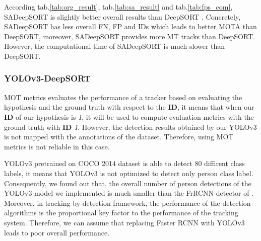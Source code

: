 According tab.\ref{tab:org_result}, tab.\ref{tab:sa_result} and tab.\ref{tab:fps_com}, SADeepSORT is slightly better overall results than DeepSORT\cite{Wojke2017simple}
. Concretely, SADeepSORT has less overall FN, FP and IDs which leads to better MOTA than DeepSORT\cite{Wojke2017simple}, moreover, 
SADeepSORT provides more MT tracks than DeepSORT\cite{Wojke2017simple}. However, the computational time of SADeepSORT is much slower than DeepSORT\cite{Wojke2017simple}.



\subsubsection{YOLOv3-DeepSORT}

\hspace{0.5cm}MOT metrics\cite{Milan2016MOT16AB} evaluates the performance of a tracker based on evaluating the hypothesis and the ground truth with respect to the \textbf{ID}, it means that
when our \textbf{ID} of our hypothesis is \textit{1}, it will be used to compute evaluation metrics with the ground truth with \textbf{ID} \textit{1}. However, the detection results obtained
by our YOLOv3 is not mapped with the annotations of the dataset. Therefore, using MOT metrics \cite{Milan2016MOT16AB} is not reliable in this case.\par 

YOLOv3 pretrained on COCO 2014 dataset is able to detect 80 diffirent class labels, it means that YOLOv3 is not optimized to detect only person class label. Consequently, 
we found out that, the overall number of person detections of the YOLOv3 model we implemented is  much smaller than the FrRCNN detector of \cite{Wojke2017simple}. Moreover, 
in tracking-by-detection framework, the performance of the detection algorithms is the proportional key factor to the performance of the tracking system. Therefore,
we can assume that replacing Faster RCNN with YOLOv3 leads to poor overall performance.



